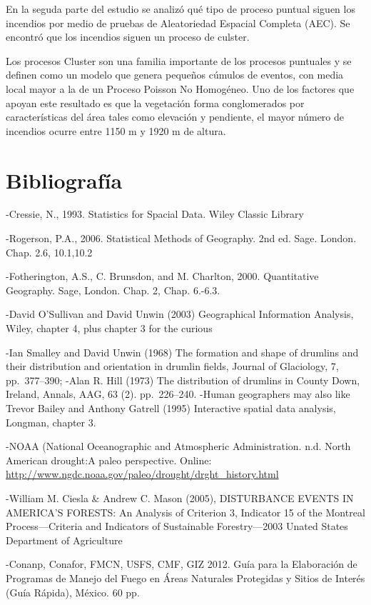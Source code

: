 \documentclass[12,]{article}
\begin{document}
En la seguda parte del estudio se analizó qué tipo de proceso puntual
siguen los incendios por medio de pruebas de Aleatoriedad Espacial
Completa (AEC). Se encontró que los incendios siguen un proceso de
culster.

Los procesos Cluster son una familia importante de los procesos
puntuales y se definen como un modelo que genera pequeños cúmulos de
eventos, con media local mayor a la de un Proceso Poisson No Homogéneo.
Uno de los factores que apoyan este resultado es que la vegetación forma
conglomerados por características del área tales como elevación y
pendiente, el mayor número de incendios ocurre entre 1150 m y 1920 m de
altura.

\pagebreak

\section{Bibliografía}\label{bibliografia}

-Cressie, N., 1993. Statistics for Spacial Data. Wiley Classic Library

-Rogerson, P.A., 2006. Statistical Methods of Geography. 2nd ed. Sage.
London. Chap. 2.6, 10.1,10.2

-Fotherington, A.S., C. Brunsdon, and M. Charlton, 2000. Quantitative
Geography. Sage, London. Chap. 2, Chap. 6.-6.3.

-David O'Sullivan and David Unwin (2003) Geographical Information
Analysis, Wiley, chapter 4, plus chapter 3 for the curious

-Ian Smalley and David Unwin (1968) The formation and shape of drumlins
and their distribution and orientation in drumlin fields, Journal of
Glaciology, 7, pp.~377--390; -Alan R. Hill (1973) The distribution of
drumlins in County Down, Ireland, Annals, AAG, 63 (2). pp.~226--240.
-Human geographers may also like Trevor Bailey and Anthony Gatrell
(1995) Interactive spatial data analysis, Longman, chapter 3.

-NOAA (National Oceanographic and Atmospheric Administration. n.d. North
American drought:A paleo perspective. Online:
\url{http://www.ngdc.noaa.gov/paleo/drought/drght_history.html}

-William M. Ciesla \& Andrew C. Mason (2005), DISTURBANCE EVENTS IN
AMERICA'S FORESTS: An Analysis of Criterion 3, Indicator 15 of the
Montreal Process---Criteria and Indicators of Sustainable
Forestry---2003 Unated States Department of Agriculture

-Conanp, Conafor, FMCN, USFS, CMF, GIZ 2012. Guía para la Elaboración de
Programas de Manejo del Fuego en Áreas Naturales Protegidas y Sitios de
Interés (Guía Rápida), México. 60 pp.
\end{document}
